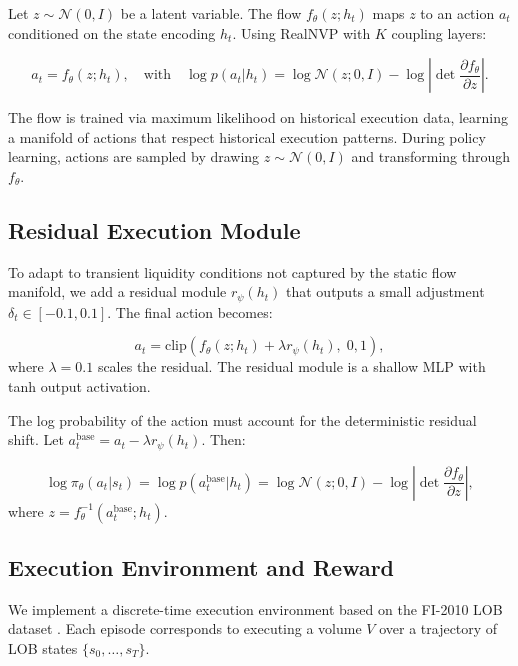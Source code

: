 \documentclass{article}
\begin{document}
Let $z \sim \mathcal{N}(0, I)$ be a latent variable. The flow $f_\theta(z; h_t)$ maps $z$ to an action $a_t$ conditioned on the state encoding $h_t$. Using RealNVP \citep{dinh2017density} with $K$ coupling layers:

\begin{equation}
    a_t = f_\theta(z; h_t), \quad \text{with} \quad \log p(a_t | h_t) = \log \mathcal{N}(z; 0, I) - \log \left| \det \frac{\partial f_\theta}{\partial z} \right|.
\end{equation}

The flow is trained via maximum likelihood on historical execution data, learning a manifold of actions that respect historical execution patterns. During policy learning, actions are sampled by drawing $z \sim \mathcal{N}(0, I)$ and transforming through $f_\theta$.

\subsection{Residual Execution Module}
\label{subsec:residual}

To adapt to transient liquidity conditions not captured by the static flow manifold, we add a residual module $r_\psi(h_t)$ that outputs a small adjustment $\delta_t \in [-0.1, 0.1]$. The final action becomes:

\begin{equation}
    a_t = \text{clip}\left( f_\theta(z; h_t) + \lambda r_\psi(h_t), \; 0, 1 \right),
\end{equation}
where $\lambda = 0.1$ scales the residual. The residual module is a shallow MLP with tanh output activation.

The log probability of the action must account for the deterministic residual shift. Let $a_t^{\text{base}} = a_t - \lambda r_\psi(h_t)$. Then:

\begin{equation}
    \log \pi_\theta(a_t | s_t) = \log p(a_t^{\text{base}} | h_t) = \log \mathcal{N}(z; 0, I) - \log \left| \det \frac{\partial f_\theta}{\partial z} \right|,
\end{equation}
where $z = f_\theta^{-1}(a_t^{\text{base}}; h_t)$.

\subsection{Execution Environment and Reward}
\label{subsec:env}

We implement a discrete-time execution environment based on the FI-2010 LOB dataset \citep{nystrom2014high}. Each episode corresponds to executing a volume $V$ over a trajectory of LOB states $\{s_0, \dots, s_T\}$.
\end{document}
